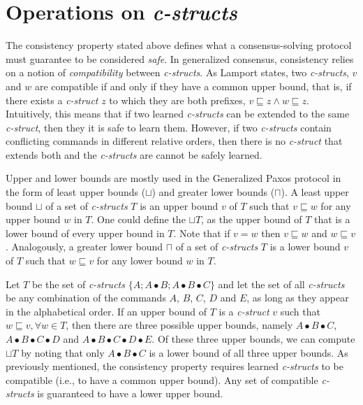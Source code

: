 \section{Operations on \textit{c-structs}} \label{Operations}
The consistency property stated above defines what a consensus-solving protocol must guarantee to be considered \textit{safe}. In generalized consensus, consistency relies on a notion of \textit{compatibility} between \textit{c-structs}. As Lamport states, two \textit{c-structs}, $v$ and $w$ are compatible if and only if they have a common upper bound, that is, if there exists a \textit{c-struct} $z$ to which they are both prefixes, $v \sqsubseteq z \land w \sqsubseteq z$. Intuitively, this means that if two learned \textit{c-structs} can be extended to the same \textit{c-struct}, then they it is safe to learn them. However, if two \textit{c-structs} contain conflicting commands in different relative orders, then there is no \textit{c-struct} that extends both and the \textit{c-structs} are cannot be safely learned.\par
Upper and lower bounds are mostly used in the Generalized Paxos protocol in the form of least upper bounds ($\sqcup$) and greater lower bounds ($\sqcap$). A least upper bound $\sqcup$ of a set of \textit{c-structs} $T$  is an upper bound $v$ of $T$ such that $v \sqsubseteq w$ for any upper bound $w$ in $T$. One could define the $\sqcup T$, as the upper bound of $T$ that is a lower bound of every upper bound in $T$. Note that if $v = w$ then $v\sqsubseteq w$ and $w\sqsubseteq v$. Analogously, a greater lower bound $\sqcap$ of a set of \textit{c-structs} $T$ is a lower bound $v$ of $T$ such that $w \sqsubseteq v$ for any lower bound $w$ in $T$. \par
Let $T$ be the set of \textit{c-structs} $\{A ; A \bullet B ; A \bullet B \bullet C\}$ and let the set of all \textit{c-structs} be any combination of the commands $A$, $B$, $C$, $D$ and $E$, as long as they appear in the alphabetical order. If an upper bound of $T$ is a \textit{c-struct} $v$ such that $w \sqsubseteq v, \forall w \in T$, then there are three possible upper bounds, namely $A \bullet B \bullet C$, $A \bullet B \bullet C \bullet D$ and $A \bullet B \bullet C \bullet D \bullet E$. Of these three upper bounds, we can compute $\sqcup T$ by noting that only $A \bullet B \bullet C$ is a lower bound of all three upper bounds. As previously mentioned, the consistency property requires learned \textit{c-structs} to be compatible (i.e., to have a common upper bound). Any set of compatible \textit{c-structs} is guaranteed to have a lower upper bound. \par 
